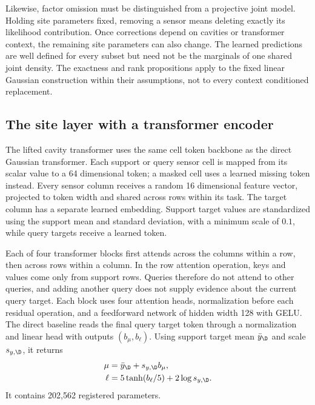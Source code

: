 Likewise, factor omission must be distinguished from a projective joint model. Holding site parameters fixed, removing a sensor means deleting exactly its likelihood contribution. Once corrections depend on cavities or transformer context, the remaining site parameters can also change. The learned predictions are well defined for every subset but need not be the marginals of one shared joint density. The exactness and rank propositions apply to the fixed linear Gaussian construction within their assumptions, not to every context conditioned replacement.

\subsection{The site layer with a transformer encoder}

The lifted cavity transformer uses the same cell token backbone as the direct Gaussian transformer. Each support or query sensor cell is mapped from its scalar value to a 64 dimensional token; a masked cell uses a learned missing token instead. Every sensor column receives a random 16 dimensional feature vector, projected to token width and shared across rows within its task. The target column has a separate learned embedding. Support target values are standardized using the support mean and standard deviation, with a minimum scale of $0.1$, while query targets receive a learned token.

Each of four transformer blocks first attends across the columns within a row, then across rows within a column. In the row attention operation, keys and values come only from support rows. Queries therefore do not attend to other queries, and adding another query does not supply evidence about the current query target. Each block uses four attention heads, normalization before each residual operation, and a feedforward network of hidden width 128 with GELU. The direct baseline reads the final query target token through a normalization and linear head with outputs $(b_\mu,b_\ell)$. Using support target mean $\bar y_{\D}$ and scale $s_{y,\D}$, it returns
\begin{equation}
  \begin{aligned}
  \mu&=\bar y_{\D}+s_{y,\D}b_\mu,\\
  \ell&=5\tanh(b_\ell/5)+2\log s_{y,\D}.
  \end{aligned}
  \label{meth:direct-head}
\end{equation}
It contains 202,562 registered parameters.

